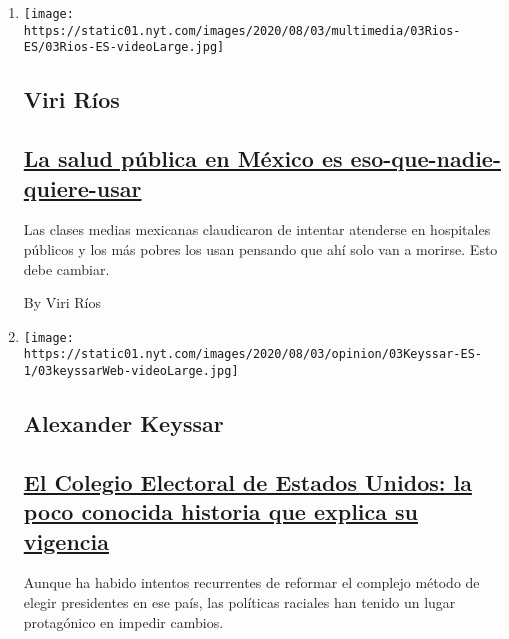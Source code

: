 \begin{enumerate}
\def\labelenumi{\arabic{enumi}.}
\item
  \texttt{[image: https://static01.nyt.com/images/2020/08/03/multimedia/03Rios-ES/03Rios-ES-videoLarge.jpg]}

  \hypertarget{viri-ruxedos}{%
  \subsection{Viri Ríos}\label{viri-ruxedos}}

  \hypertarget{la-salud-puxfablica-en-muxe9xico-es-eso-que-nadie-quiere-usar}{%
  \subsection{\texorpdfstring{\href{/es/2020/08/03/espanol/opinion/servicio-salud-mexico.html}{La
  salud pública en México es
  eso-que-nadie-quiere-usar}}{La salud pública en México es eso-que-nadie-quiere-usar}}\label{la-salud-puxfablica-en-muxe9xico-es-eso-que-nadie-quiere-usar}}

  Las clases medias mexicanas claudicaron de intentar atenderse en
  hospitales públicos y los más pobres los usan pensando que ahí solo
  van a morirse. Esto debe cambiar.

  By Viri Ríos
\item
  \texttt{[image: https://static01.nyt.com/images/2020/08/03/opinion/03Keyssar-ES-1/03keyssarWeb-videoLarge.jpg]}

  \hypertarget{alexander-keyssar}{%
  \subsection{Alexander Keyssar}\label{alexander-keyssar}}

  \hypertarget{el-colegio-electoral-de-estados-unidos-la-poco-conocida-historia-que-explica-su-vigencia}{%
  \subsection{\texorpdfstring{\href{/es/2020/08/03/espanol/opinion/colegio-electoral-estados-unidos.html}{El
  Colegio Electoral de Estados Unidos: la poco conocida historia que
  explica su
  vigencia}}{El Colegio Electoral de Estados Unidos: la poco conocida historia que explica su vigencia}}\label{el-colegio-electoral-de-estados-unidos-la-poco-conocida-historia-que-explica-su-vigencia}}

  Aunque ha habido intentos recurrentes de reformar el complejo método
  de elegir presidentes en ese país, las políticas raciales han tenido
  un lugar protagónico en impedir cambios.


\end{enumerate}
